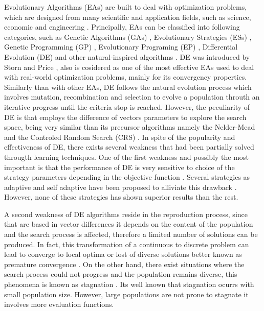 Evolutionary Algorithms (EAs) are built to deal with optimization problems, which are designed from many scientific and application fields, such as science, economic and engineering \cite{noman2008differential, chakraborty2008advances}.
%
Principally, EAs can be classified into following categories, such as Genetic Algorithms (GAs) \cite{srinivas1994genetic, schwefel1977numerische} , Evolutionary Strategies (ESs) \cite{john1992holland}, Genetic Programming (GP) \cite{koza1992genetic}, Evolutionary Programing (EP) \cite{fogel1991meta}, Differential Evolution (DE) \cite{storn1997differential} and other natural-inspired algorithms \cite{das2011differential}.
%
%
DE was introduced by Storn and Price \cite{storn1997differential}, also is cosidered as one of the most effective EAs used to deal with real-world optimization problems, mainly for its convergency properties.
%
Similarly than with other EAs, DE follows the natural evolution process which involves mutation, recombination and selection to evolve a population throuth an iterative progress until the criteria stop is reached.
%
However, the peculiarity of DE is that employs the difference of vectors parameters to explore the search space, being very similar than its precursor algorithms namely the Nelder-Mead \cite{nelder1965simplex} and the Controled Random Search (CRS) \cite{price1983global}.
%
In spite of the popularity and effectiveness of DE, there exists several weakness that had been partially solved througth learning techniques.
%
One of the first weakness and possibly the most important is that the performance of DE is very sensitive to choice of the strategy parameters depending in the objective function \cite{gamperle2002parameter}.
%
Several strategies as adaptive and self adaptive have been proposed to alliviate this drawback \cite{brest2006self, zhang2009jade}.
%
However, none of these strategies has shown superior results than the rest.
%

A second weakness of DE algorithms reside in the reproduction process, since that are based in vector differences it depends on the content of the population and the search process is affected, therefore a limited number of solutions can be produced.
%
In fact, this transformation of a continuous to discrete problem can lead to converge to local optima or lost of diverse solutions better known as premature convergence \cite{sa2008exploration}.
%
On the other hand, there exist situations where the search process could not progress and the population remains diverse, this phenomena is known as stagnation \cite{lampinen2000stagnation}.
%
Its well known that stagnation ocurrs with small population size.
%
However, large populations are not prone to stagnate it involves more evaluation functions.

